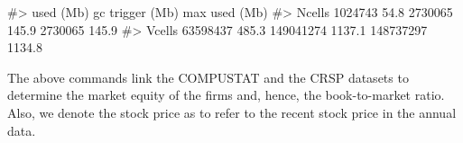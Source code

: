 \begin{Schunk}
\begin{Soutput}
#>            used  (Mb) gc trigger   (Mb)  max used   (Mb)
#> Ncells  1024743  54.8    2730065  145.9   2730065  145.9
#> Vcells 63598437 485.3  149041274 1137.1 148737297 1134.8
\end{Soutput}
\end{Schunk} %
The above commands link the COMPUSTAT and the CRSP datasets to
determine the market equity of the firms and, hence, the book-to-market
ratio. Also, we denote the stock price as  to refer to
the recent stock price in the annual data.

